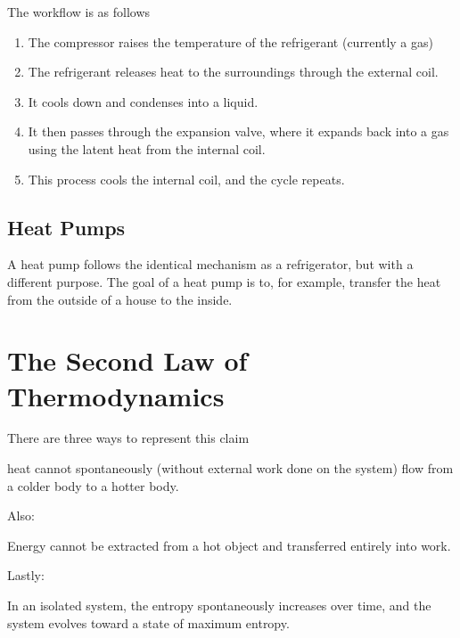 \documentclass[a4paper,12pt]{article}
\let\oldsection\section
\renewcommand\section{\clearpage\oldsection}
\begin{document}
The workflow is as follows
\begin{enumerate}
  \item The compressor raises the temperature of the refrigerant (currently a gas)
  \item The refrigerant releases heat to the surroundings through the external coil.
  \item It cools down and condenses into a liquid.
  \item It then passes through the expansion valve, where it expands back into a gas using the latent heat from the internal coil.
  \item This process cools the internal coil, and the cycle repeats.
\end{enumerate}

\pagebreak

\subsection{Heat Pumps}

A heat pump follows the identical mechanism as a refrigerator, but with a different purpose. The goal of a heat pump is to, for example, transfer the heat from the outside of a house to the inside.

\section{The Second Law of Thermodynamics}

\begin{law}
  There are three ways to represent this claim\\
  \begin{center}
    \begin{minipage}{0.9\textwidth}
      \begin{center}
        heat cannot spontaneously (without external work done on the system) flow from a colder body to a hotter body.
      \end{center}
    \end{minipage}
  \end{center}

  Also:
  \begin{center}
    \begin{minipage}{0.9\textwidth}
      \begin{center}
        Energy cannot be extracted from a hot object and transferred entirely into work.
      \end{center}
    \end{minipage}
  \end{center}

  Lastly:
  \begin{center}
    \begin{minipage}{0.9\textwidth}
      \begin{center}
        In an isolated system, the entropy spontaneously increases over time, and the system evolves toward a state of maximum entropy.
      \end{center}
    \end{minipage}
  \end{center}


\end{law}
\end{document}
